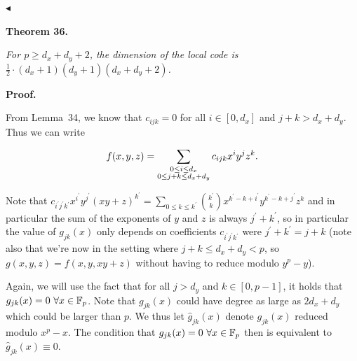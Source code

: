 \documentclass[10pt,a4paper]{article}
\begin{document}
$\blacktriangleleft$\par





\par\medskip\noindent\textbf{
\textbf{Theorem 36}\textbf{.}
}\par



\emph{For $p\geq d_{x}+d_{y}+2$, the dimension of the local code is $\frac{1}{2}\cdot(d_{x}+1)(d_{y}+1)(d_{x}+d_{y}+2)$.}\par







\par\medskip\noindent\textbf{Proof.}\par




From Lemma 34, we know that $c_{ijk}=0$ for all $i\in[0,d_{x}]$ and $j+k>d_{x}+d_{y}$. Thus we can write\par


\[\begin{gathered}
\displaystyle f(x,y,z) \displaystyle=\sum_{\begin{subarray}{c}0\leq i\leq d_{x}\\
0\leq j+k\leq d_{x}+d_{y}\end{subarray}}c_{ijk}x^{i}y^{j}z^{k}.
\end{gathered}\]


Note that $c_{i^{\prime}j^{\prime}k^{\prime}}x^{i^{\prime}}y^{j^{\prime}}(xy+z)^{k^{\prime}}=\sum_{0\leq k\leq k^{\prime}}\binom{k^{\prime}}{k}x^{k^{\prime}-k+i^{\prime}}y^{k^{\prime}-k+j^{\prime}}z^{k}$ and in particular the sum of the exponents of $y$ and $z$ is always $j^{\prime}+k^{\prime}$, so in particular the value of $g_{jk}(x)$ only depends on coefficients $c_{i^{\prime}j^{\prime}k^{\prime}}$ were $j^{\prime}+k^{\prime}=j+k$ (note also that we’re now in the setting where $j+k\leq d_{x}+d_{y}<p$, so $g(x,y,z)=f(x,y,xy+z)$ without having to reduce modulo $y^{p}-y$).\par




Again, we will use the fact that for all $j>d_{y}$ and $k\in[0,p-1]$, it holds that $g_{jk}(x)=0\nobreak\ \forall x\in\mathbb{F}_{p}$. Note that $g_{jk}(x)$ could have degree as large as $2d_{x}+d_{y}$ which could be larger than $p$. We thus let $\hat{g}_{jk}(x)$ denote $g_{jk}(x)$ reduced modulo $x^{p}-x$. The condition that $g_{jk}(x)=0\nobreak\ \forall x\in\mathbb{F}_{p}$ then is equivalent to $\hat{g}_{jk}(x)\equiv 0$.\par
\end{document}
